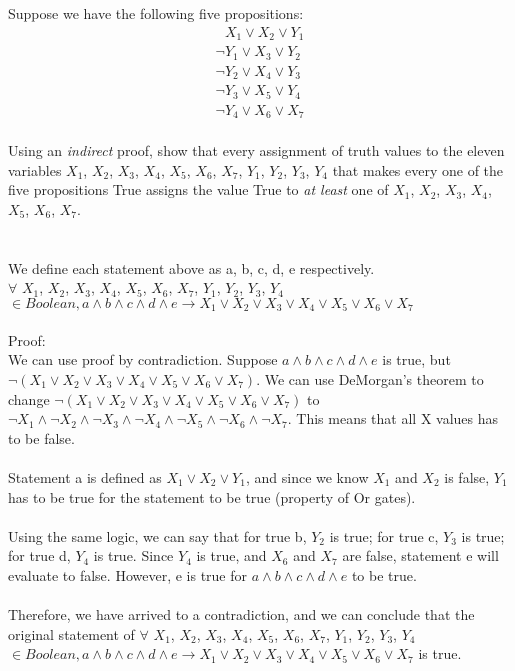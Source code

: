 \item[6] Suppose we have the following five propositions:
\begin{displaymath}
\begin{array}{l}
\phantom{\lnot}X_1 \lor X_2 \lor Y_1 \\
\lnot Y_1 \lor X_3 \lor Y_2 \\
\lnot Y_2 \lor X_4 \lor Y_3 \\
\lnot Y_3 \lor X_5 \lor Y_4 \\
\lnot Y_4 \lor X_6 \lor X_7 \\
\end{array}
\end{displaymath}

Using an \emph {indirect} proof, show that every assignment of truth values to the eleven variables $X_1$, $X_2$, $X_3$, $X_4$, $X_5$, $X_6$, $X_7$, $Y_1$, $Y_2$, $Y_3$, $Y_4$ that makes every one of the five propositions True assigns the value True to \emph {at least} one of $X_1$, $X_2$, $X_3$, $X_4$, $X_5$, $X_6$, $X_7$.
\\
\\
{\color{NavyBlue}
\\We define each statement above as a, b, c, d, e respectively.
\\ $\forall $ $X_1$, $X_2$, $X_3$, $X_4$, $X_5$, $X_6$, $X_7$, $Y_1$, $Y_2$, $Y_3$, $Y_4$ $ \in Boolean, a \land b \land c \land d \land e \rightarrow X_1 \lor X_2 \lor X_3 \lor X_4 \lor X_5 \lor X_6 \lor X_7$
\\
\\Proof:
\\ We can use proof by contradiction. Suppose $a \land b \land c \land d \land e$ is true, but $\lnot (X_1 \lor X_2 \lor X_3 \lor X_4 \lor X_5 \lor X_6 \lor X_7)$. We can use DeMorgan's theorem to change $\lnot (X_1 \lor X_2 \lor X_3 \lor X_4 \lor X_5 \lor X_6 \lor X_7)$ to $\lnot X_1 \land \lnot X_2 \land \lnot X_3 \land \lnot X_4 \land \lnot X_5 \land \lnot X_6 \land \lnot X_7$. This means that all X values has to be false. 
\\
\\Statement a is defined as $X_1 \lor X_2 \lor Y_1$, and since we know $X_1$ and $X_2$ is false, $Y_1$ has to be true for the statement to be true (property of Or gates). \\
\\Using the same logic, we can say that for true b, $Y_2$ is true; for true c, $Y_3$ is true; for true d, $Y_4$ is true. Since $Y_4$ is true, and $ X_6$ and $ X_7$ are false, statement e will evaluate to false. However, e is true for $a \land b \land c \land d \land e$ to be true. 
\\
\\Therefore, we have arrived to a contradiction, and we can conclude that the original statement of 
$\forall $ $X_1$, $X_2$, $X_3$, $X_4$, $X_5$, $X_6$, $X_7$, $Y_1$, $Y_2$, $Y_3$, $Y_4$ $ \in Boolean, a \land b \land c \land d \land e \rightarrow X_1 \lor X_2 \lor X_3 \lor X_4 \lor X_5 \lor X_6 \lor X_7$ is true.
\\
\\\boxed{}
}
\newpage